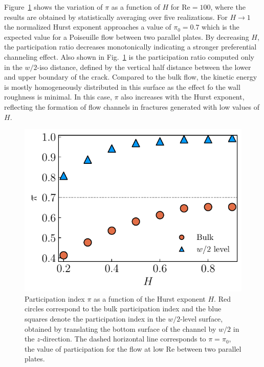 \documentclass[aps,pre,
superscriptaddress,
twocolumn,
notitlepage,
10pt,]{revtex4-1}
\begin{document}
Figure~\ref{fig6} shows the variation of  $\pi$ as a function of $H$ for
$\mathrm{Re} = 100$, where the results are obtained by statistically
averaging over five realizations. For $H\rightarrow 1$ the normalized Hurst
exponent approaches a value of $\pi_0=0.7$ which is the expected value for
a Poiseuille flow between two parallel plates. By decreasing $H$, the
participation ratio decreases monotonically indicating a stronger
preferential channeling effect. Also shown in Fig.~\ref{fig6}  is the
participation ratio computed only in the  $ w/2 $-iso distance, defined by
the vertical half distance between the lower and upper boundary of the
crack. Compared to the bulk flow, the kinetic energy is mostly
homogeneously distributed in this surface as the effect fo the wall
roughness is minimal. In this case, $\pi$ also increases with the Hurst
exponent, reflecting the formation of flow channels in fractures generated
with low values of $H$.

\begin{figure}[!h]%
\includegraphics[width=0.99\columnwidth]{fig6.pdf}
\caption{Participation index $\pi$ as a function of the Hurst exponent $H$. Red
circles correspond to the bulk participation index and the blue squares denote
the participation index in the $w/2$-level surface, obtained by translating the
bottom surface of the channel by $w/2$ in the $ z $-direction. The dashed
horizontal line corresponds to $\pi=\pi_{0}$, the value of participation for the
flow at low $\mathrm{Re}$ between two parallel plates.} \label{fig6} %
\end{figure}
\end{document}
